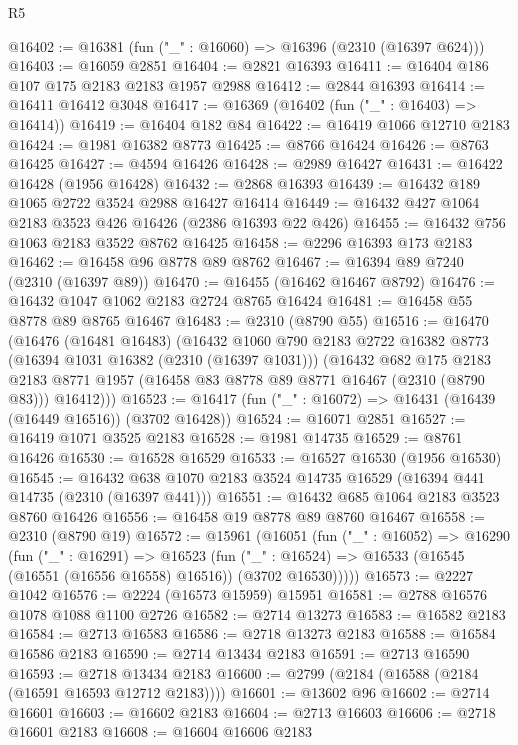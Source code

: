 \begin{lexlean}{R5}
\begin{coremodule}
@16402 := @16381 (fun ("_" : @16060) => @16396 (@2310 (@16397 @624)))
@16403 := @16059 @2851
@16404 := @2821 @16393
@16411 := @16404 @186 @107 @175 @2183 @2183 @1957 @2988
@16412 := @2844 @16393
@16414 := @16411 @16412 @3048
@16417 := @16369 (@16402 (fun ("_" : @16403) => @16414))
@16419 := @16404 @182 @84
@16422 := @16419 @1066 @12710 @2183
@16424 := @1981 @16382 @8773
@16425 := @8766 @16424
@16426 := @8763 @16425
@16427 := @4594 @16426
@16428 := @2989 @16427
@16431 := @16422 @16428 (@1956 @16428)
@16432 := @2868 @16393
@16439 := @16432 @189 @1065 @2722 @3524 @2988 @16427 @16414
@16449 := @16432 @427 @1064 @2183 @3523 @426 @16426 (@2386 @16393 @22 @426)
@16455 := @16432 @756 @1063 @2183 @3522 @8762 @16425
@16458 := @2296 @16393 @173 @2183
@16462 := @16458 @96 @8778 @89 @8762
@16467 := @16394 @89 @7240 (@2310 (@16397 @89))
@16470 := @16455 (@16462 @16467 @8792)
@16476 := @16432 @1047 @1062 @2183 @2724 @8765 @16424
@16481 := @16458 @55 @8778 @89 @8765 @16467
@16483 := @2310 (@8790 @55)
@16516 := @16470
    (@16476
      (@16481 @16483)
      (@16432
        @1060
        @790
        @2183
        @2722
        @16382
        @8773
        (@16394 @1031 @16382 (@2310 (@16397 @1031)))
        (@16432
          @682
          @175
          @2183
          @2183
          @8771
          @1957
          (@16458 @83 @8778 @89 @8771 @16467 (@2310 (@8790 @83)))
          @16412)))
@16523 := @16417 (fun ("_" : @16072) => @16431 (@16439 (@16449 @16516)) (@3702 @16428))
@16524 := @16071 @2851
@16527 := @16419 @1071 @3525 @2183
@16528 := @1981 @14735
@16529 := @8761 @16426
@16530 := @16528 @16529
@16533 := @16527 @16530 (@1956 @16530)
@16545 := @16432 @638 @1070 @2183 @3524 @14735 @16529 (@16394 @441 @14735 (@2310 (@16397 @441)))
@16551 := @16432 @685 @1064 @2183 @3523 @8760 @16426
@16556 := @16458 @19 @8778 @89 @8760 @16467
@16558 := @2310 (@8790 @19)
@16572 := @15961
    (@16051
      (fun ("_" : @16052) =>
      @16290
        (fun ("_" : @16291) =>
        @16523
          (fun ("_" : @16524) => @16533 (@16545 (@16551 (@16556 @16558) @16516)) (@3702 @16530)))))
@16573 := @2227 @1042
@16576 := @2224 (@16573 @15959) @15951
@16581 := @2788 @16576 @1078 @1088 @1100 @2726
@16582 := @2714 @13273
@16583 := @16582 @2183
@16584 := @2713 @16583
@16586 := @2718 @13273 @2183
@16588 := @16584 @16586 @2183
@16590 := @2714 @13434 @2183
@16591 := @2713 @16590
@16593 := @2718 @13434 @2183
@16600 := @2799 (@2184 (@16588 (@2184 (@16591 @16593 @12712 @2183))))
@16601 := @13602 @96
@16602 := @2714 @16601
@16603 := @16602 @2183
@16604 := @2713 @16603
@16606 := @2718 @16601 @2183
@16608 := @16604 @16606 @2183

\end{coremodule}
\end{lexlean}
